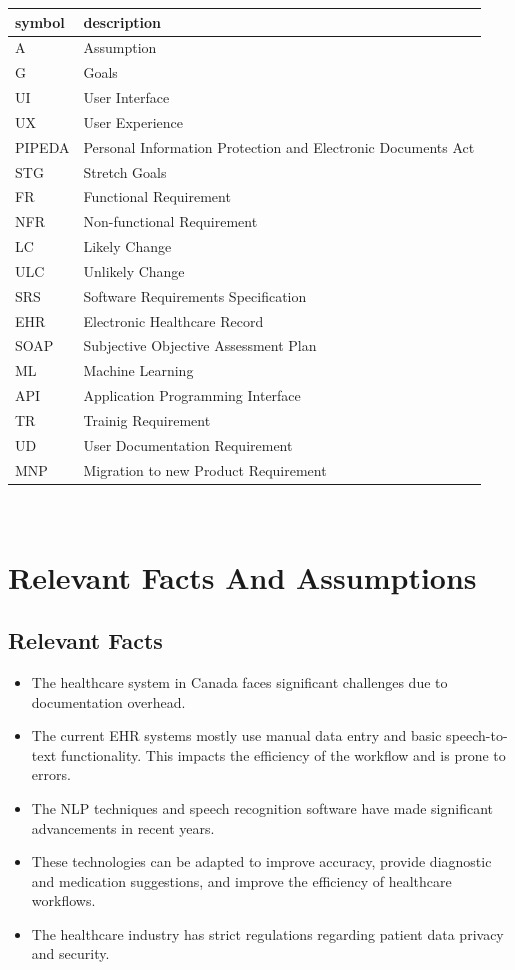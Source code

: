 \documentclass[12pt]{article}
\begin{document}
\begin{tabular}{l l} 
  \toprule    
  \textbf{symbol} & \textbf{description}\\
  \midrule 
  A & Assumption\\
  G & Goals\\
  UI & User Interface\\
  UX & User Experience\\
  PIPEDA & Personal Information Protection and Electronic Documents Act\\
  STG & Stretch Goals\\
  FR & Functional Requirement\\
  NFR & Non-functional Requirement\\
  LC & Likely Change\\
  ULC & Unlikely Change\\
  SRS & Software Requirements Specification\\
  EHR & Electronic Healthcare Record\\
  SOAP & Subjective Objective Assessment Plan \\
  ML & Machine Learning \\
  API & Application Programming Interface \\
  TR & Trainig Requirement \\
  UD & User Documentation Requirement \\
  MNP & Migration to new Product Requirement \\
  \bottomrule
\end{tabular}\\

\section{Relevant Facts And Assumptions}

\subsection{Relevant Facts}
\begin{itemize}
  
  \item The healthcare system in Canada faces significant challenges due to documentation overhead.
  
  \item The current EHR systems mostly use manual data entry and basic speech-to-text functionality. This impacts the efficiency of the workflow and is prone to errors.
  
  \item The NLP techniques and speech recognition software have made significant advancements in recent years. 
  
  \item These technologies can be adapted to improve accuracy, provide diagnostic and medication suggestions, and improve the efficiency of healthcare workflows. 
  
  \item The healthcare industry has strict regulations regarding patient data privacy and security.

\end{itemize}
\end{document}

